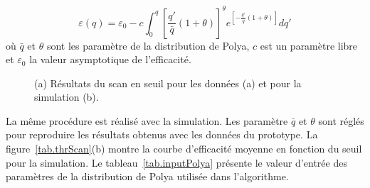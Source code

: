 \begin{equation}
  \label{eq.fitScan}
  \varepsilon(q)=\varepsilon _0 - c\int_0^q{[\frac{q'}{\bar q}(1+\theta)]^{\theta}e^{[-\frac{q'}{\bar q}(1+\theta)]}dq'}
\end{equation}
où $\bar q$ et $\theta$ sont les paramètre de la distribution de Polya, $c$ est un paramètre libre et $\varepsilon_0$ la valeur asymptotique de l'efficacité.
\begin{figure}[!ht]
  \caption{(a) Résultats du scan en seuil pour les données (a) et pour la simulation (b). \label{fig.thrScan}}
\end{figure}
 La même procédure est réalisé avec la simulation. Les paramètre $\bar q$ et $\theta$ sont réglés pour reproduire les résultats obtenus avec les données du prototype. La figure~\ref{tab.thrScan}(b) montre la courbe d'efficacité moyenne en fonction du seuil pour la simulation. Le tableau~\ref{tab.inputPolya} présente le valeur d'entrée des paramètres de la distribution de Polya utilisée dans l'algorithme.
